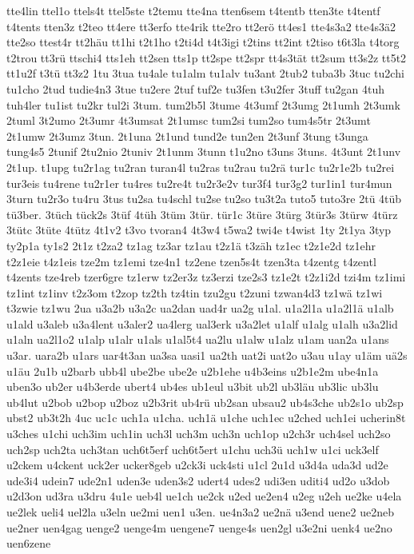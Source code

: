 {tte4lin
ttel1o
ttels4t
ttel5ste
t2temu
tte4na
tten6sem
t4tentb
tten3te
t4tentf
t4tents
tten3z
t2teo
tt4ere
tt3erfo
tte4rik
tte2ro
tt2erö
tt4es1
tte4s3a2
tte4s3ä2
tte2so
ttest4r
tt2häu
tt1hi
t2t1ho
t2ti4d
t4t3igi
t2tins
tt2int
t2tiso
t6t3la
t4torg
t2trou
tt3rü
ttschi4
tts1eh
tt2sen
tts1p
tt2spe
tt2spr
tt4s3tät
tt2sum
tt3s2z
tt5t2
tt1u2f
t3tü
tt3z2
1tu
3tua
tu4ale
tu1alm
tu1alv
tu3ant
2tub2
tuba3b
3tuc
tu2chi
tu1cho
2tud
tudie4n3
3tue
tu2ere
2tuf
tuf2e
tu3fen
t3u2fer
3tuff
tu2gan
4tuh
tuh4ler
tu1ist
tu2kr
tul2i
3tum.
tum2b5l
3tume
4t3umf
2t3umg
2t1umh
2t3umk
2tuml
3t2umo
2t3umr
4t3umsat
2t1umsc
tum2si
tum2so
tum4s5tr
2t3umt
2t1umw
2t3umz
3tun.
2t1una
2t1und
tund2e
tun2en
2t3unf
3tung
t3unga
tung4s5
2tunif
2tu2nio
2tuniv
2t1unm
3tunn
t1u2no
t3uns
3tuns.
4t3unt
2t1unv
2t1up.
t1upg
tu2r1ag
tu2ran
turan4l
tu2ras
tu2rau
tu2rä
tur1c
tu2r1e2b
tu2rei
tur3eis
tu4rene
tu2r1er
tu4res
tu2re4t
tu2r3e2v
tur3f4
tur3g2
tur1in1
tur4mun
3turn
tu2r3o
tu4ru
3tus
tu2sa
tu4schl
tu2se
tu2so
tu3t2a
tuto5
tuto3re
2tü
4tüb
tü3ber.
3tüch
tück2s
3tüf
4tüh
3tüm
3tür.
tür1c
3türe
3türg
3tür3s
3türw
4türz
3tütc
3tüte
4tütz
4t1v2
t3vo
tvoran4
4t3w4
t5wa2
twi4e
t4wist
1ty
2t1ya
3typ
ty2p1a
ty1s2
2t1z
t2za2
tz1ag
tz3ar
tz1au
t2z1ä
t3zäh
tz1ec
t2z1e2d
tz1ehr
t2z1eie
t4z1eis
tze2m
tz1emi
tze4n1
tz2ene
tzen5s4t
tzen3ta
t4zentg
t4zentl
t4zents
tze4reb
tzer6gre
tz1erw
tz2er3z
tz3erzi
tze2s3
tz1e2t
t2z1i2d
tzi4m
tz1imi
tz1int
tz1inv
t2z3om
t2zop
tz2th
tz4tin
tzu2gu
t2zuni
tzwan4d3
tz1wä
tz1wi
t3zwie
tz1wu
2ua
u3a2b
u3a2c
ua2dan
uad4r
ua2g
u1al.
u1a2l1a
u1a2l1ä
u1alb
u1ald
u3aleb
u3a4lent
u3aler2
ua4lerg
ual3erk
u3a2let
u1alf
u1alg
u1alh
u3a2lid
u1aln
ua2l1o2
u1alp
u1alr
u1als
u1al5t4
ua2lu
u1alw
u1alz
u1am
uan2a
u1ans
u3ar.
uara2b
u1ars
uar4t3an
ua3sa
uasi1
ua2th
uat2i
uat2o
u3au
u1ay
u1äm
uä2s
u1äu
2u1b
u2barb
ubb4l
ube2be
ube2e
u2b1ehe
u4b3eins
u2b1e2m
ube4n1a
uben3o
ub2er
u4b3erde
ubert4
ub4es
ub1eul
u3bit
ub2l
ub3läu
ub3lic
ub3lu
ub4lut
u2bob
u2bop
u2boz
u2b3rit
ub4rü
ub2san
ubsau2
ub4s3che
ub2s1o
ub2sp
ubst2
ub3t2h
4uc
uc1c
uch1a
u1cha.
uch1ä
u1che
uch1ec
u2ched
uch1ei
ucherin8t
u3ches
u1chi
uch3im
uch1in
uch3l
uch3m
uch3n
uch1op
u2ch3r
uch4sel
uch2so
uch2sp
uch2ta
uch3tan
uch6t5erf
uch6t5ert
u1chu
uch3ü
uch1w
u1ci
uck3elf
u2ckem
u4ckent
uck2er
ucker8geb
u2ck3i
uck4sti
u1cl
2u1d
u3d4a
uda3d
ud2e
ude3i4
udein7
ude2n1
uden3e
uden3s2
udert4
udes2
udi3en
uditi4
ud2o
u3dob
u2d3on
ud3ra
u3dru
4u1e
ueb4l
ue1ch
ue2ck
u2ed
ue2en4
u2eg
u2eh
ue2ke
u4ela
ue2lek
ueli4
uel2la
u3eln
ue2mi
uen1
u3en.
ue4n3a2
ue2nä
u3end
uene2
ue2neb
ue2ner
uen4gag
uenge2
uenge4m
uengene7
uenge4s
uen2gl
u3e2ni
uenk4
ue2no
uen6zene
}
